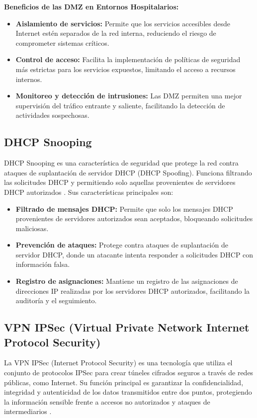\textbf{Beneficios de las \acs{DMZ} en Entornos Hospitalarios:}
\begin{itemize}
    \item \textbf{Aislamiento de servicios:} Permite que los servicios accesibles desde Internet estén separados de la red interna, reduciendo el riesgo de comprometer sistemas críticos.
    \item \textbf{Control de acceso:} Facilita la implementación de políticas de seguridad más estrictas para los servicios expuestos, limitando el acceso a recursos internos.
    \item \textbf{Monitoreo y detección de intrusiones:} Las DMZ permiten una mejor supervisión del tráfico entrante y saliente, facilitando la detección de actividades sospechosas.
\end{itemize}

\subsection{DHCP Snooping}
\label{subsec:dhcpsnooping}
\acs{DHCP} Snooping es una característica de seguridad que protege la red contra ataques de suplantación de servidor \acs{DHCP} (DHCP Spoofing). Funciona filtrando las solicitudes DHCP y
permitiendo solo aquellas provenientes de servidores \acs{DHCP} autorizados \cite{cisco_dhcp_snooping}. Sus características principales son:
\begin{itemize}
    \item \textbf{Filtrado de mensajes \acs{DHCP}:} Permite que solo los mensajes \acs{DHCP} provenientes de servidores autorizados sean aceptados, bloqueando solicitudes maliciosas.
    \item \textbf{Prevención de ataques:} Protege contra ataques de suplantación de servidor \acs{DHCP}, donde un atacante intenta responder a solicitudes \acs{DHCP} con información falsa.
    \item \textbf{Registro de asignaciones:} Mantiene un registro de las asignaciones de direcciones IP realizadas por los servidores \acs{DHCP} autorizados, facilitando la auditoría y el seguimiento.
\end{itemize}

\subsection{VPN IPSec (Virtual Private Network Internet Protocol Security)}
\label{subsec:ipsec}
La \acs{VPN} \acs{IPSec} (Internet Protocol Security) es una tecnología que utiliza el conjunto de protocolos \acs{IPSec} para crear túneles cifrados seguros a través de redes públicas, 
como Internet. Su función principal es garantizar la confidencialidad, integridad y autenticidad de los datos transmitidos entre dos puntos, protegiendo la información 
sensible frente a accesos no autorizados y ataques de intermediarios \cite{ipsec}.

